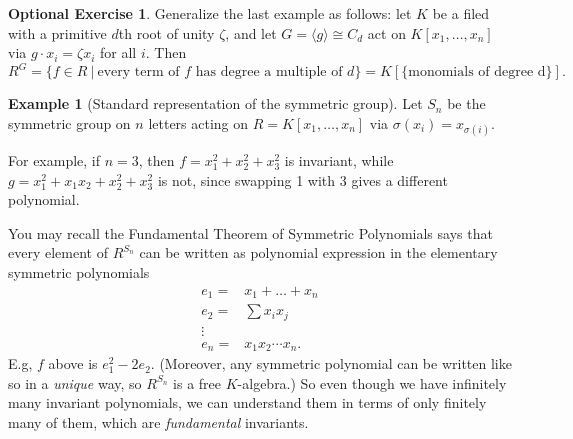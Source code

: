 \documentclass{amsart}[12pt]
\numberwithin{equation}{section}
\theoremstyle{plain} %
\theoremstyle{definition}
\newtheorem{ex}[equation]{Example}
\newtheorem{exer}[equation]{Optional Exercise}
\theoremstyle{remark}
\begin{document}
		 
		 \begin{exer} Generalize the last example as follows: let $K$ be a filed with a primitive $d$th root of unity $\zeta$, and let $G= \langle g \rangle \cong C_d$ act on $K[x_1,\dots,x_n]$ via $g\cdot x_i = \zeta x_i$ for all $i$. Then
		 \[ R^G = \{ f \in R \ | \ \text{every term of $f$ has degree a multiple of $d$}\} = K[\{ \text{monomials of degree d}\}].\]
		 \end{exer}		 
		

\begin{ex}[Standard representation of the symmetric group]
\label{ex:symmetric}
	Let $S_n$ be the symmetric group on $n$ letters acting on $R=K[x_1,\dots,x_n]$ via $\sigma(x_i)=x_{\sigma(i)}$.
	
	For example, if $n=3$, then $f=x_1^2+x_2^2+x_3^2$ is invariant, while $g=x_1^2+x_1x_2+x_2^2+x_3^2$ is not, since swapping 1 with 3 gives a different polynomial.
	
	You may recall the Fundamental Theorem of Symmetric Polynomials says that every element of $R^{S_n}$ can be written as polynomial expression in the elementary symmetric polynomials 	
		\begin{eqnarray*}
	e_1 =&x_1+\dots +x_n\\
	e_2 =&\sum x_i x_j\\
	\vdots \\
	e_n =&x_1x_2\cdots x_n.
	\end{eqnarray*}
	E.g, $f$ above is $e_1^2-2 e_2$. (Moreover, any symmetric polynomial can be written like so in a \emph{unique} way, so $R^{S_n}$ is a free $K$-algebra.) So even though we have infinitely many invariant polynomials, we can understand them in terms of only finitely many of them, which are {\em fundamental} invariants.
\end{ex}
\end{document}

